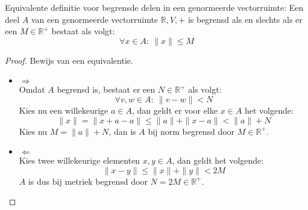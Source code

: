 \documentclass[main.tex]{subfiles}
\begin{document}
\begin{st}
  Equivalente definitie voor begrensde delen in een genormeerde vectorruimte:
  Een deel $A$ van een genormeerde vectorruimte $\mathbb{R},V,+$ is begrensd als en slechts als er een $M \in \mathbb{R}^{+}$ bestaat als volgt:
  \[ \forall x\in A:\ \|x\| \le M \]

  \begin{proof}
    Bewijs van een equivalentie.
    \begin{itemize}
    \item $\Rightarrow$\\
      Omdat $A$ begrensd is, bestaat er een $N\in \mathbb{R}^{+}$ als volgt:
      \[ \forall v,w\in A:\ \|v-w\| < N \]
      Kies nu een willekeurige $a\in A$, dan geldt er voor elke $x\in A$ het volgende:
      \[ \|x\| = \|x+a-a\| \le \|a\| + \|x-a\| < \|a\| + N \]
      Kies nu $M = \|a\|+N$, dan is $A$ bij norm begrensd door $M\in \mathbb{R}^{+}$.
    \item $\Leftarrow$\\
      Kies twee willekeurige elementen $x,y\in A$, dan geldt het volgende:
      \[ \|x-y\| \le \|x\| + \|y\| < 2M \]
      $A$ is dus bij metriek begrensd door $N=2M \in \mathbb{R}^{+}$.
    \end{itemize}
  \end{proof}
\end{st}
\end{document}
